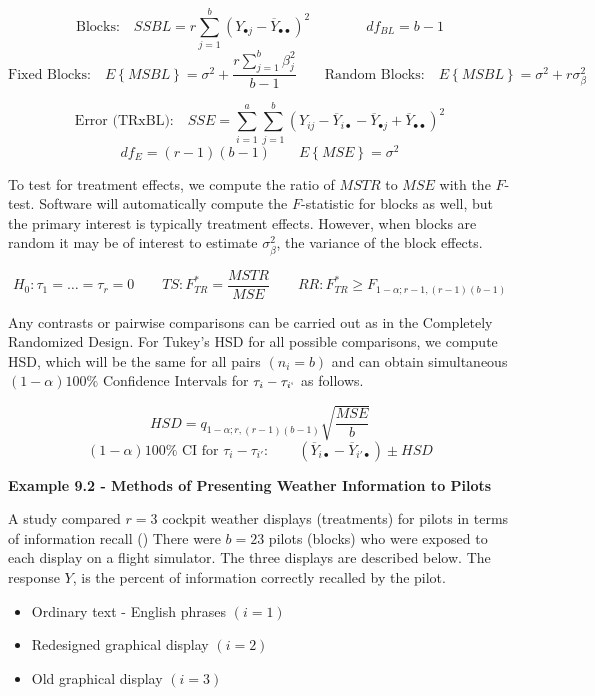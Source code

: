 \documentclass[
]{book}
\providecommand{\tightlist}{%
  \setlength{\itemsep}{0pt}\setlength{\parskip}{0pt}}
\begin{document}
\[
\mbox{Blocks:} \quad SSBL = 
r\sum_{j=1}^b \left(Y_{\bullet j}-\overline{Y}_{\bullet\bullet}\right)^2
\qquad \qquad df_{BL}=b-1 
\] \[
\mbox{Fixed Blocks:} \quad
E\left\{MSBL\right\}=
\sigma^2+\frac{r\sum_{j=1}^b\beta_j^2}{b-1}  \qquad
\mbox{Random Blocks:} \quad
E\left\{MSBL\right\}=
\sigma^2+ r\sigma_{\beta}^2
\]

\[
\mbox{Error (TRxBL):} \quad
SSE = \sum_{i=1}^a\sum_{j=1}^b\left(Y_{ij}-\overline{Y}_{i\bullet} - \overline{Y}_{\bullet j} + \overline{Y}_{\bullet\bullet}\right)^2 \]
\[df_E=(r-1)(b-1) \qquad
E\left\{MSE\right\}=
\sigma^2
\]

To test for treatment effects, we compute the ratio of \(MSTR\) to
\(MSE\) with the \(F\)-test. Software will automatically compute the
\(F\)-statistic for blocks as well, but the primary interest is
typically treatment effects. However, when blocks are random it may be
of interest to estimate \(\sigma_{\beta}^2\), the variance of the block
effects.

\[
H_0: \tau_1=\ldots = \tau_r=0 \qquad
TS: F_{TR}^*=\frac{MSTR}{MSE} \qquad
RR: F_{TR}^* \ge F_{1-\alpha;r-1,(r-1)(b-1)}
\]

Any contrasts or pairwise comparisons can be carried out as in the
Completely Randomized Design. For Tukey's HSD for all possible
comparisons, we compute HSD, which will be the same for all pairs
\(\left(n_i=b\right)\) and can obtain simultaneous \((1-\alpha)100\%\)
Confidence Intervals for \(\tau_i - \tau_{i`}\) as follows.

\[
HSD = q_{1-\alpha;r,(r-1)(b-1)}\sqrt{\frac{MSE}{b}}  
\] \[
(1-\alpha)100\% \mbox{ CI for } \tau_i-\tau_{i'}: \qquad
\left(\overline{Y}_{i\bullet}-\overline{Y}_{i'\bullet}\right) \pm HSD
\]

\textbf{Example 9.2 - Methods of Presenting Weather Information to
Pilots}

A study compared \(r=3\) cockpit weather displays (treatments) for
pilots in terms of information recall () There were \(b=23\) pilots (blocks) who were
exposed to each display on a flight simulator. The three displays are
described below. The response \(Y\), is the percent of information
correctly recalled by the pilot.

\begin{itemize}
\tightlist
\item
  Ordinary text - English phrases \((i=1)\)
\item
  Redesigned graphical display \((i=2)\)
\item
  Old graphical display \((i=3)\)
\end{itemize}
\end{document}
